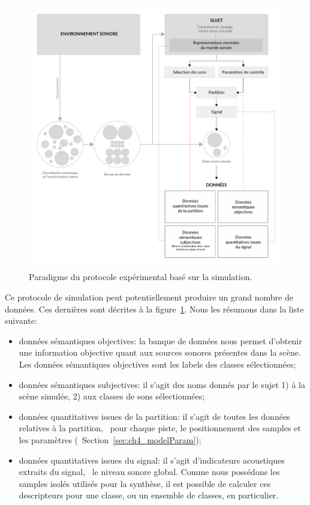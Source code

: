 \begin{figure}[t]
        \myfloatalign
        \includegraphics[width=.8\linewidth]{gfx/ch_4/schemaXP}
       \caption{Paradigme du protocole expérimental basé sur la simulation.}\label{fig:paradigmeSimu2}
\end{figure}

Ce protocole de simulation peut potentiellement produire un grand nombre de données. Ces dernières sont décrites à la figure~\ref{fig:paradigmeSimu2}.  Nous les résumons dans la liste suivante:

\begin{itemize}
\item données sémantiques objectives: la banque de données nous permet d'obtenir une information objective quant aux sources sonores présentes dans la scène. Les données sémantiques objectives sont les labels des classes sélectionnées;
\item données sémantiques subjectives: il s'agit des noms donnés par le sujet 1) à la scène simulée, 2) aux classes de sons sélectionnées;
\item données quantitatives issues de la partition: il s'agit de toutes les données relatives à la partition, \ie~pour chaque piste, le positionnement des samples et les paramètres (\cf~Section~\ref{sec:ch4_modelParam});
\item données quantitatives issues du signal: il s'agit d'indicateurs acoustiques extraits du signal, \eg~le niveau sonore global. Comme nous possédons les samples isolés utilisés pour la synthèse, il est possible de calculer ces descripteurs pour une classe, ou un ensemble de classes, en particulier.
\end{itemize}

